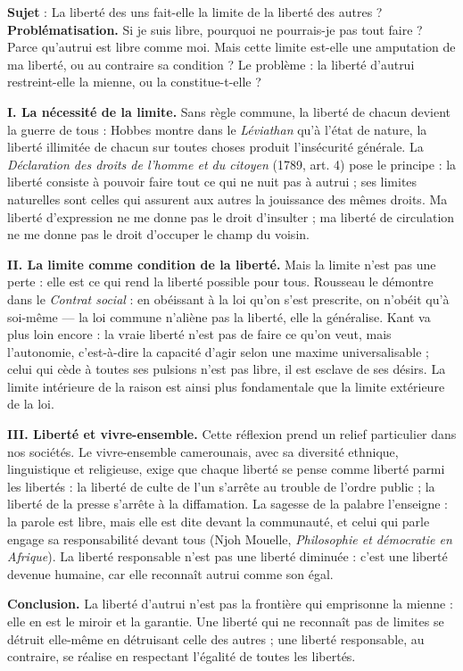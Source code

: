 \documentclass[11pt]{article}
\begin{document}
\begin{exoresolu}
\textbf{Sujet} : La liberté des uns fait-elle la limite de la liberté des autres ?
\tcblower
\textbf{Problématisation.} Si je suis libre, pourquoi ne pourrais-je pas tout faire ? Parce qu'autrui est libre comme moi. Mais cette limite est-elle une amputation de ma liberté, ou au contraire sa condition ? Le problème : la liberté d'autrui restreint-elle la mienne, ou la constitue-t-elle ?

\textbf{I. La nécessité de la limite.}
Sans règle commune, la liberté de chacun devient la guerre de tous : Hobbes montre dans le \emph{Léviathan} qu'à l'état de nature, la liberté illimitée de chacun sur toutes choses produit l'insécurité générale. La \emph{Déclaration des droits de l'homme et du citoyen} (1789, art. 4) pose le principe : la liberté consiste à pouvoir faire tout ce qui ne nuit pas à autrui ; ses limites naturelles sont celles qui assurent aux autres la jouissance des mêmes droits. Ma liberté d'expression ne me donne pas le droit d'insulter ; ma liberté de circulation ne me donne pas le droit d'occuper le champ du voisin.

\textbf{II. La limite comme condition de la liberté.}
Mais la limite n'est pas une perte : elle est ce qui rend la liberté possible pour tous. Rousseau le démontre dans le \emph{Contrat social} : en obéissant à la loi qu'on s'est prescrite, on n'obéit qu'à soi-même — la loi commune n'aliène pas la liberté, elle la généralise. Kant va plus loin encore : la vraie liberté n'est pas de faire ce qu'on veut, mais l'autonomie, c'est-à-dire la capacité d'agir selon une maxime universalisable ; celui qui cède à toutes ses pulsions n'est pas libre, il est esclave de ses désirs. La limite intérieure de la raison est ainsi plus fondamentale que la limite extérieure de la loi.

\textbf{III. Liberté et vivre-ensemble.}
Cette réflexion prend un relief particulier dans nos sociétés. Le vivre-ensemble camerounais, avec sa diversité ethnique, linguistique et religieuse, exige que chaque liberté se pense comme liberté parmi les libertés : la liberté de culte de l'un s'arrête au trouble de l'ordre public ; la liberté de la presse s'arrête à la diffamation. La sagesse de la palabre l'enseigne : la parole est libre, mais elle est dite devant la communauté, et celui qui parle engage sa responsabilité devant tous (Njoh Mouelle, \emph{Philosophie et démocratie en Afrique}). La liberté responsable n'est pas une liberté diminuée : c'est une liberté devenue humaine, car elle reconnaît autrui comme son égal.

\textbf{Conclusion.} La liberté d'autrui n'est pas la frontière qui emprisonne la mienne : elle en est le miroir et la garantie. Une liberté qui ne reconnaît pas de limites se détruit elle-même en détruisant celle des autres ; une liberté responsable, au contraire, se réalise en respectant l'égalité de toutes les libertés.
\end{exoresolu}
\end{document}

